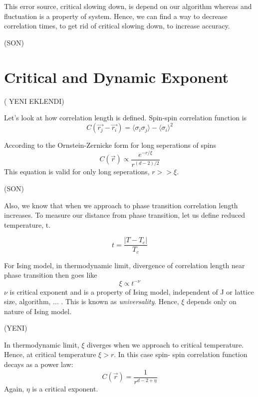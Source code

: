 \documentclass[12pt,fleqn]{report}
\begin{document}
This error source, critical slowing down, is depend on our algorithm 
whereas and fluctuation is a 
property of system. Hence, we can find a way to decrease correlation times, 
to get rid of critical slowing down,	
to increase accuracy. 

(SON)




\section{Critical and Dynamic Exponent}


( YENI EKLENDI)


Let's look at how correlation length is defined.  Spin-spin correlation 
function is 
\begin{equation}
C(\vec{r_j} -\vec{r_i}) = \langle \sigma_i \sigma_j \rangle - \langle 
\sigma_i \rangle^2
\end{equation}

According to the Ornstein-Zernicke form for long seperations of spins 
\begin{equation}
C(\vec{r})  \propto \frac{e^{-r/ \xi }}{r^{(d-2)/2}}
\end{equation}
This equation is valid for only long seperations, $r >> \xi $. 

(SON)








Also, we know that when we approach to phase transition correlation 
length increases. To measure our distance from phase transition, let us 
define reduced temperature, t.

\begin{equation}
t = \frac{|T- T_c|}{T_c}
\end{equation}

For Ising model, in thermodynamic limit, divergence of correlation length 
near phase transition then goes like 
\begin{equation}
\xi \propto t^{-\nu}
\end{equation}
\cite[p.  88]{newman} $\nu$ is critical exponent and is a property of Ising 
model, independent of J or lattice size, algorithm, ... . This is known as 
\textit{universality}. Hence, $\xi$ depends only on nature of Ising model. 







(YENI)

In thermodynamic limit, $\xi$ diverges when we approach to critical 
temperature. Hence, at critical temperature $\xi  > r$. In this case spin-
spin correlation function decays as a power law:
\begin{equation}
C(\vec{r}) = \frac{1}{r^{d-2+ \eta }}
\end{equation}
Again, $\eta$ is a  critical exponent.
\end{document}
